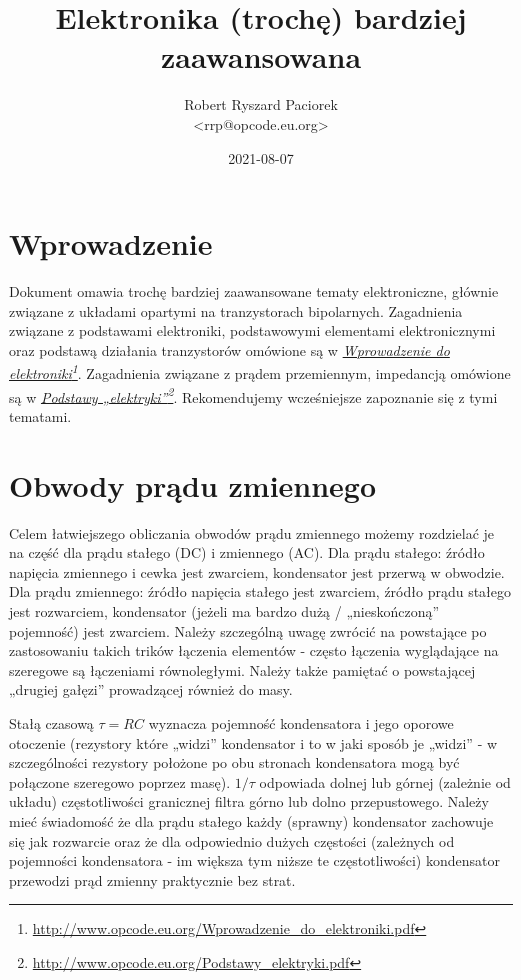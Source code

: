\documentclass{pdfBooklets}
\title{Elektronika (trochę) bardziej zaawansowana}
\author{%
	Robert Ryszard Paciorek\\\normalsize\ttfamily <rrp@opcode.eu.org>
}
\date  {2021-08-07}
\newcommand\verbhref[2]{\href{#1}{#2}\footnote{\url{#1}}}
\begin{document}
\maketitle

\section{Wprowadzenie}

Dokument omawia trochę bardziej zaawansowane tematy elektroniczne, głównie związane z układami opartymi na tranzystorach bipolarnych.
Zagadnienia związane z podstawami elektroniki, podstawowymi elementami elektronicznymi oraz podstawą działania tranzystorów omówione są w \textit{\verbhref{http://www.opcode.eu.org/Wprowadzenie_do_elektroniki.pdf}{Wprowadzenie do elektroniki}}.
Zagadnienia związane z prądem przemiennym, impedancją omówione są w \textit{\verbhref{http://www.opcode.eu.org/Podstawy_elektryki.pdf}{Podstawy „elektryki”}}.
Rekomendujemy wcześniejsze zapoznanie się z tymi tematami.

\section{Obwody prądu zmiennego}
Celem łatwiejszego obliczania obwodów prądu zmiennego możemy rozdzielać je na część dla prądu stałego (DC) i zmiennego (AC).
Dla prądu stałego: źródło napięcia zmiennego i cewka jest zwarciem, kondensator jest przerwą w obwodzie.
Dla prądu zmiennego: źródło napięcia stałego jest zwarciem, źródło prądu stałego jest rozwarciem, kondensator (jeżeli ma bardzo dużą / „nieskończoną” pojemność) jest zwarciem.
Należy szczególną uwagę zwrócić na powstające po zastosowaniu takich trików łączenia elementów - często łączenia wyglądające na szeregowe są łączeniami równoległymi.
Należy także pamiętać o powstającej „drugiej gałęzi” prowadzącej również do masy.

Stałą czasową $\tau = RC$ wyznacza pojemność kondensatora i jego oporowe otoczenie
	(rezystory które „widzi” kondensator i to w jaki sposób je „widzi” - w szczególności rezystory położone po obu stronach kondensatora mogą być połączone szeregowo poprzez masę).
$1/\tau$ odpowiada dolnej lub górnej (zależnie od układu) częstotliwości granicznej filtra górno lub dolno przepustowego.
Należy mieć świadomość że dla prądu stałego każdy (sprawny) kondensator zachowuje się jak rozwarcie oraz że dla odpowiednio dużych częstości
	(zależnych od pojemności kondensatora - im większa tym niższe te częstotliwości) kondensator przewodzi prąd zmienny praktycznie bez strat.
\end{document}
